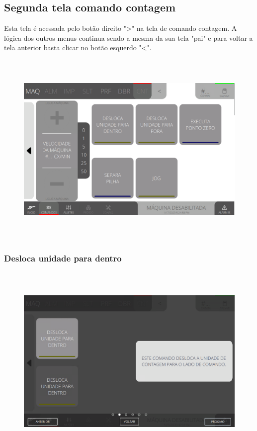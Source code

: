 \newpage
\thispagestyle{fancy}
\vspace*{\fill}
\subsection{Segunda tela comando contagem}
Esta tela é acessada pelo botão direito "\textgreater" na tela de comando contagem. A lógica dos outros menus continua sendo a mesma da sua tela "pai" e para voltar a tela anterior basta clicar no botão esquerdo "\textless{}".
\begin{figure}[h]
  \centering
  \includegraphics[width=576px,height=360px]{src/imagesFlexo/08-count/commands/e-Tela-Principal-2.png}
\end{figure}

\newpage
\thispagestyle{fancy}
\vspace*{\fill}
\subsubsection{\small{Desloca unidade para dentro}}
\begin{figure}[h]
  \centering
  \includegraphics[width=576px,height=360px]{src/imagesFlexo/08-count/commands/e-9.png}
\end{figure}
\vspace*{\fill}

